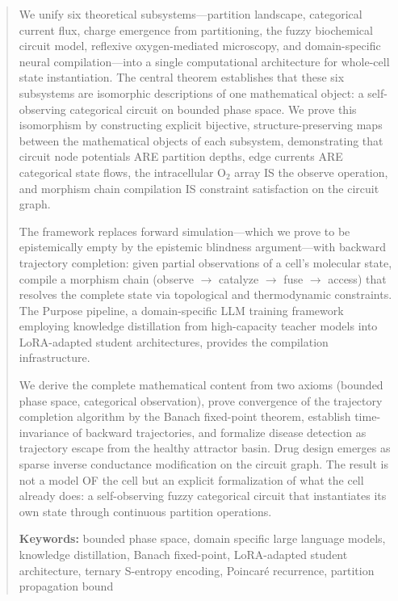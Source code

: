 \documentclass[twocolumn,10pt,a4paper]{article}
\theoremstyle{definition}
\theoremstyle{remark}
\begin{document}
\begin{abstract}
\noindent We unify six theoretical subsystems---partition landscape, categorical current flux, charge emergence from partitioning, the fuzzy biochemical circuit model, reflexive oxygen-mediated microscopy, and domain-specific neural compilation---into a single computational architecture for whole-cell state instantiation. The central theorem establishes that these six subsystems are isomorphic descriptions of one mathematical object: a self-observing categorical circuit on bounded phase space. We prove this isomorphism by constructing explicit bijective, structure-preserving maps between the mathematical objects of each subsystem, demonstrating that circuit node potentials ARE partition depths, edge currents ARE categorical state flows, the intracellular O$_2$ array IS the observe operation, and morphism chain compilation IS constraint satisfaction on the circuit graph.

The framework replaces forward simulation---which we prove to be epistemically empty by the epistemic blindness argument---with backward trajectory completion: given partial observations of a cell's molecular state, compile a morphism chain (observe $\to$ catalyze $\to$ fuse $\to$ access) that resolves the complete state via topological and thermodynamic constraints. The Purpose pipeline, a domain-specific LLM training framework employing knowledge distillation from high-capacity teacher models into LoRA-adapted student architectures, provides the compilation infrastructure.

We derive the complete mathematical content from two axioms (bounded phase space, categorical observation), prove convergence of the trajectory completion algorithm by the Banach fixed-point theorem, establish time-invariance of backward trajectories, and formalize disease detection as trajectory escape from the healthy attractor basin. Drug design emerges as sparse inverse conductance modification on the circuit graph. The result is not a model OF the cell but an explicit formalization of what the cell already does: a self-observing fuzzy categorical circuit that instantiates its own state through continuous partition operations.

\medskip
\noindent\textbf{Keywords:} bounded phase space, domain specific large language models, knowledge distillation, Banach fixed-point, LoRA-adapted student architecture,  ternary S-entropy encoding,  Poincaré recurrence, partition propagation bound

\end{abstract}
\end{document}
